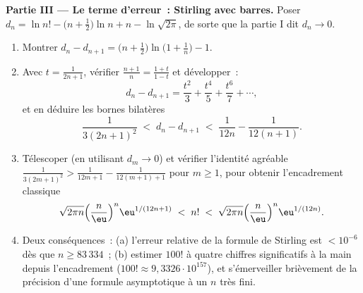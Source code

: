\begin{problem}
\medskip
\noindent\textbf{Partie III --- Le terme d'erreur~: Stirling
avec barres.} Poser $d_n = \ln n! - \bigl(n +
\tfrac12\bigr)\ln n + n - \ln\sqrt{2\pi}$, de sorte que la
partie I dit $d_n \to 0$.
\begin{enumerate}[resume]
  \item Montrer $d_n - d_{n+1} = \bigl(n +
        \tfrac12\bigr)\ln\bigl(1 + \tfrac1n\bigr) - 1$.
  \item Avec $t = \frac1{2n+1}$, vérifier $\frac{n+1}n =
        \frac{1+t}{1-t}$ et développer~:
        \[
        d_n - d_{n+1} = \frac{t^2}3 + \frac{t^4}5 +
        \frac{t^6}7 + \cdots,
        \]
        et en déduire les bornes bilatères
        \[
        \frac1{3(2n+1)^2} \;<\; d_n - d_{n+1} \;<\;
        \frac1{12n} - \frac1{12(n+1)} .
        \]
  \item Télescoper (en utilisant $d_m \to 0$) et vérifier
        l'identité  agréable $\frac1{3(2m+1)^2} >
        \frac1{12m+1} - \frac1{12(m+1)+1}$ pour $m \geq 1$,
        pour obtenir l'encadrement classique
        \[
        \sqrt{2\pi n}\Bigl(\frac n\eu\Bigr)^n
        \eu^{1/(12n+1)} \;<\; n! \;<\;
        \sqrt{2\pi n}\Bigl(\frac n\eu\Bigr)^n\eu^{1/(12n)} .
        \]
  \item Deux conséquences~: (a) l'erreur relative de la
        formule de Stirling est $< 10^{-6}$ dès que $n \geq
        83\,334$~; (b) estimer $100!$ à quatre chiffres
        significatifs à la main depuis l'encadrement ($100!
        \approx 9{,}3326\cdot 10^{157}$), et s'émerveiller
        brièvement de la précision d'une formule
        asymptotique à un $n$ très fini.
\end{enumerate}


\end{problem}
